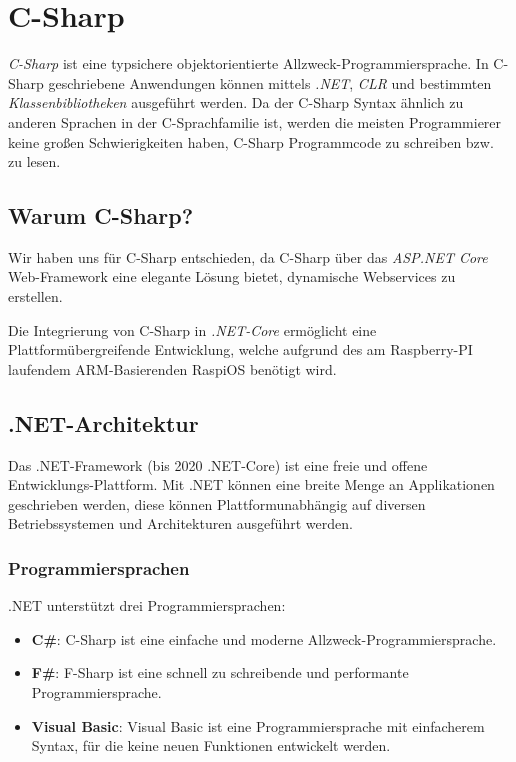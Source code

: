 \section{C-Sharp}
\label{C-Sharp}

\textit{C-Sharp} ist eine typsichere objektorientierte Allzweck-Programmiersprache.
In C-Sharp geschriebene Anwendungen können mittels \textit{.NET}, \textit{CLR} und bestimmten 
\textit{Klassenbibliotheken} ausgeführt werden. 
Da der C-Sharp Syntax ähnlich zu anderen Sprachen in der C-Sprachfamilie ist, werden die meisten
Programmierer keine großen Schwierigkeiten haben, C-Sharp Programmcode zu schreiben bzw. zu lesen.  
\cite{csharpmicrosoft}

\subsection{Warum C-Sharp?}
Wir haben uns für C-Sharp entschieden, da C-Sharp über das \textit{ASP.NET Core} Web-Framework eine elegante 
Lösung bietet, dynamische Webservices zu erstellen.

Die Integrierung von C-Sharp in \textit{.NET-Core} ermöglicht eine Plattformübergreifende Entwicklung, 
welche aufgrund des am Raspberry-PI laufendem ARM-Basierenden RaspiOS benötigt wird.

\subsection{.NET-Architektur}
Das .NET-Framework (bis 2020 .NET-Core) ist eine freie und offene Entwicklungs-Plattform. Mit .NET können eine breite Menge an
Applikationen geschrieben werden, diese können Plattformunabhängig auf diversen Betriebssystemen
und Architekturen ausgeführt werden. \cite{dotnetmicrosoft} 

\subsubsection{Programmiersprachen}
.NET unterstützt drei Programmiersprachen:
\begin{itemize}
    \item \textbf{C\#}: C-Sharp ist eine einfache und moderne Allzweck-Programmiersprache.
    \item \textbf{F\#}: F-Sharp ist eine schnell zu schreibende und performante Programmiersprache.
    \item \textbf{Visual Basic}: Visual Basic ist eine Programmiersprache mit einfacherem Syntax, für die keine
    neuen Funktionen entwickelt werden.  
\end{itemize}

